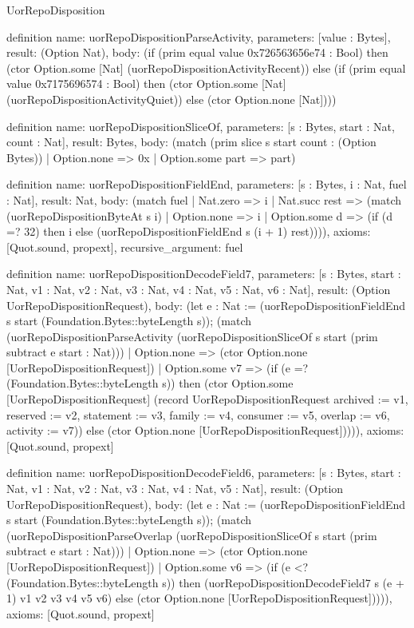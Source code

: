 \begin{lexlean}{UorRepoDisposition}
\begin{semanticmodule}
definition{
  name: uorRepoDispositionParseActivity,
  parameters: [value : Bytes],
  result: (Option Nat),
  body: (if (prim equal value 0x726563656e74 : Bool) then (ctor Option.some [Nat] (uorRepoDispositionActivityRecent)) else (if (prim equal value 0x7175696574 : Bool) then (ctor Option.some [Nat] (uorRepoDispositionActivityQuiet)) else (ctor Option.none [Nat])))
}

definition{
  name: uorRepoDispositionSliceOf,
  parameters: [s : Bytes, start : Nat, count : Nat],
  result: Bytes,
  body: (match (prim slice s start count : (Option Bytes))
    | Option.none => 0x
    | Option.some part => part)
}

definition{
  name: uorRepoDispositionFieldEnd,
  parameters: [s : Bytes, i : Nat, fuel : Nat],
  result: Nat,
  body: (match fuel
    | Nat.zero => i
    | Nat.succ rest => (match (uorRepoDispositionByteAt s i)
      | Option.none => i
      | Option.some d => (if (d =? 32) then i else (uorRepoDispositionFieldEnd s (i + 1) rest)))),
  axioms: [Quot.sound, propext],
  recursive_argument: fuel
}

definition{
  name: uorRepoDispositionDecodeField7,
  parameters: [s : Bytes, start : Nat, v1 : Nat, v2 : Nat, v3 : Nat, v4 : Nat, v5 : Nat, v6 : Nat],
  result: (Option UorRepoDispositionRequest),
  body: (let e : Nat := (uorRepoDispositionFieldEnd s start (Foundation.Bytes::byteLength s)); (match (uorRepoDispositionParseActivity (uorRepoDispositionSliceOf s start (prim subtract e start : Nat)))
    | Option.none => (ctor Option.none [UorRepoDispositionRequest])
    | Option.some v7 => (if (e =? (Foundation.Bytes::byteLength s)) then (ctor Option.some [UorRepoDispositionRequest] (record UorRepoDispositionRequest {archived := v1, reserved := v2, statement := v3, family := v4, consumer := v5, overlap := v6, activity := v7})) else (ctor Option.none [UorRepoDispositionRequest])))),
  axioms: [Quot.sound, propext]
}

definition{
  name: uorRepoDispositionDecodeField6,
  parameters: [s : Bytes, start : Nat, v1 : Nat, v2 : Nat, v3 : Nat, v4 : Nat, v5 : Nat],
  result: (Option UorRepoDispositionRequest),
  body: (let e : Nat := (uorRepoDispositionFieldEnd s start (Foundation.Bytes::byteLength s)); (match (uorRepoDispositionParseOverlap (uorRepoDispositionSliceOf s start (prim subtract e start : Nat)))
    | Option.none => (ctor Option.none [UorRepoDispositionRequest])
    | Option.some v6 => (if (e <? (Foundation.Bytes::byteLength s)) then (uorRepoDispositionDecodeField7 s (e + 1) v1 v2 v3 v4 v5 v6) else (ctor Option.none [UorRepoDispositionRequest])))),
  axioms: [Quot.sound, propext]
}


\end{semanticmodule}
\end{lexlean}

